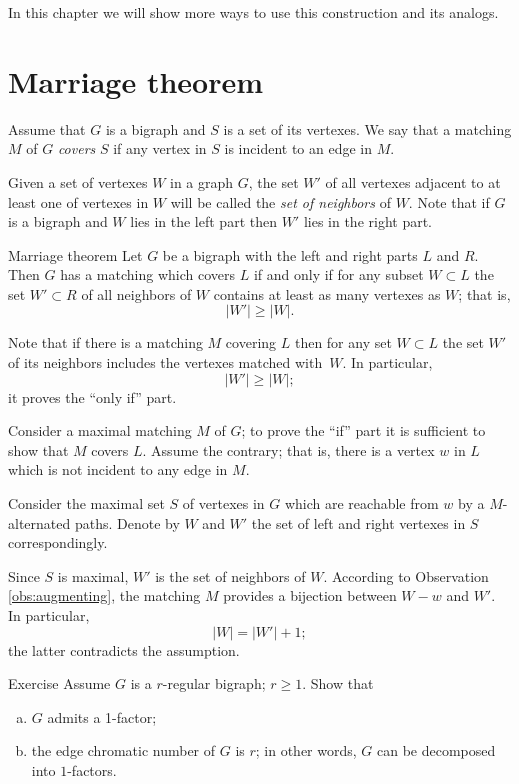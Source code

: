 In this chapter we will show more ways to use this construction and its analogs.

\section*{Marriage theorem}

Assume that $G$ is a bigraph and $S$ is a set of its vertexes.
We say that a matching $M$ of $G$ {}\emph{covers} $S$ if any vertex in $S$ is incident to an edge in $M$.

Given a set of vertexes $W$ in a graph $G$, the set $W'$ of all vertexes  adjacent to at least one of vertexes in $W$ will be called the \emph{set of neighbors} of $W$.
Note that if $G$ is a bigraph and $W$ lies in the left part then $W'$ lies in the right part. 

\begin{thm}{Marriage theorem}
Let $G$ be a bigraph with the left and right parts $L$ and $R$.
Then $G$ has a matching which covers $L$ if and only if for any subset $W\subset L$ the set $W'\subset R$ of all neighbors of $W$ contains at least as many vertexes as $W$; that is, 
\[|W'|\ge |W|.\] 

\end{thm}

Note that if there is a matching $M$ covering $L$ then for any set  $W\subset L$ the set $W'$ of its neighbors includes the vertexes matched with~$W$.
In particular,
\[|W'|\ge |W|;\]
it proves the ``only if'' part.

Consider a maximal matching $M$ of $G$;
to prove the ``if'' part it is sufficient to show that $M$ covers $L$.
Assume the contrary; that is, there is a vertex $w$ in $L$ which is not incident to any edge in $M$.

Consider the maximal set $S$ of vertexes in $G$ which are reachable from $w$ by a 
$M$-alternated paths.
Denote by $W$ and $W'$ the set of left and right vertexes in $S$ correspondingly.

Since $S$ is maximal, $W'$ is the set of neighbors of $W$. 
According to Observation \ref{obs:augmenting}, the matching $M$ provides a bijection between $W-w$ and $W'$.
In particular, 
\[|W|=|W'|+1;\] 
the latter contradicts the assumption.
\qeds

\begin{thm}{Exercise}
Assume $G$ is a $r$-regular bigraph; $r\ge 1$.
Show that 
\begin{enumerate}[(a)]
\item $G$ admits a 1-factor;
\item the edge chromatic number of $G$ is $r$; in other words, $G$ can be decomposed into $1$-factors.
\end{enumerate}

\end{thm}

